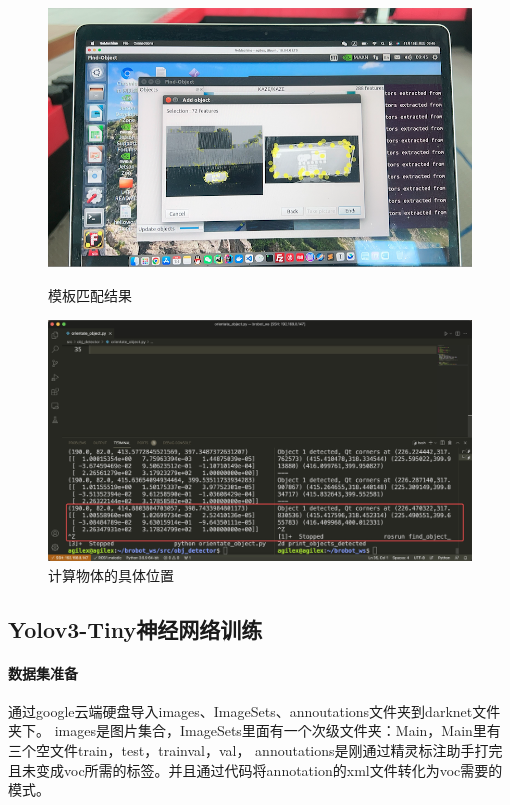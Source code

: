 \documentclass[a4paper,twoside]{article}
\begin{document}
\begin{figure}[htbp]
	\centering
	\begin{minipage}{0.49\linewidth}
		\centering
		\includegraphics[width=1\linewidth]{findobject.png}
		\caption{模板匹配结果}
	\end{minipage}
	\begin{minipage}{0.49\linewidth}
		\centering
		\includegraphics[width=1\linewidth]{findobjectpos.jpg}
		\caption{计算物体的具体位置}
	\end{minipage}
\end{figure}

\subsection{Yolov3-Tiny神经网络训练}
\paragraph{数据集准备}
通过google云端硬盘导入images、ImageSets、annoutations文件夹到darknet文件夹下。
images是图片集合，ImageSets里面有一个次级文件夹：Main，Main里有三个空文件train，test，trainval，val，
annoutations是刚通过精灵标注助手打完且未变成voc所需的标签。并且通过代码将annotation的xml文件转化为voc需要的模式。
\end{document}
